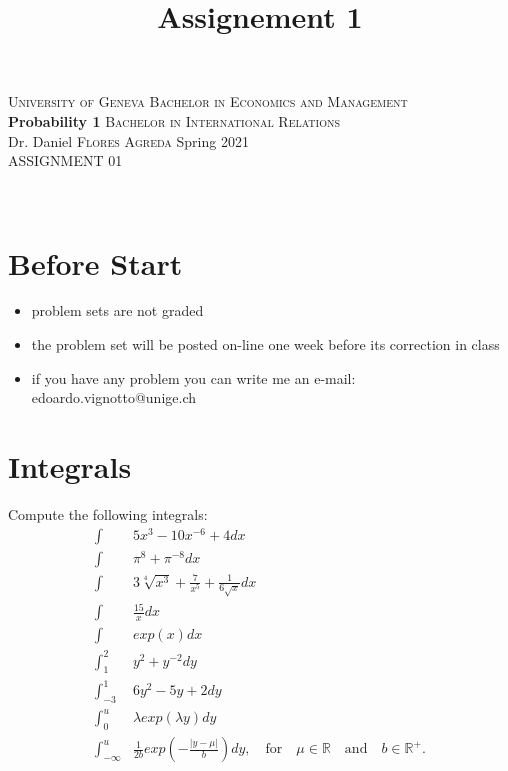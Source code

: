\documentclass[12pt,a4paper,titlepage]{article}\usepackage[]{graphicx}\usepackage[]{color}
\title{Assignement 1}
\begin{document}
\noindent \textsc{University of Geneva}     \hfill \textsc{Bachelor in Economics and Management} \\
\textbf{Probability 1}                      \hfill \textsc{Bachelor in International Relations} \\
Dr. Daniel \textsc{Flores Agreda}                 \hfill Spring 2021  \\
ASSIGNMENT 01

\noindent
\makebox[\linewidth]{\rule{\textwidth}{0.4pt}}\\[1.5ex]
\section*{Before Start}
\begin{itemize}
\item problem sets are not graded
\item the problem set will be posted on-line one week before its correction in class
\item if you have any problem you can write me an e-mail: edoardo.vignotto@unige.ch
\end{itemize}






\section{Integrals}


Compute the following integrals: \\
\begin{align*}
\int& 5x^{3}-10x^{-6}+4 dx \\
\int&  \pi^{8}+\pi^{-8} dx \\
\int& 3\sqrt[4]{x^{3}}+\frac{7}{x^{5}}+\frac{1}{6\sqrt{x}}dx \\
\int& \frac{15}{x}dx \\
\int & exp(x)dx\\
\int_{1}^{2}& y^{2}+y^{-2}dy \\
\int_{-3}^{1}& 6y^{2}-5y+2dy \\
\int_{0}^{u}& \lambda exp(\lambda y) dy \\
\int_{-\infty}^{u}& \frac{1}{2b} exp\left (-\frac{|y-\mu|}{b}\right) dy, \quad \text{for} \quad \mu \in \mathbb{R} \quad \text{and} \quad b \in \mathbb{R}^{+}.
\end{align*}
\end{document}
